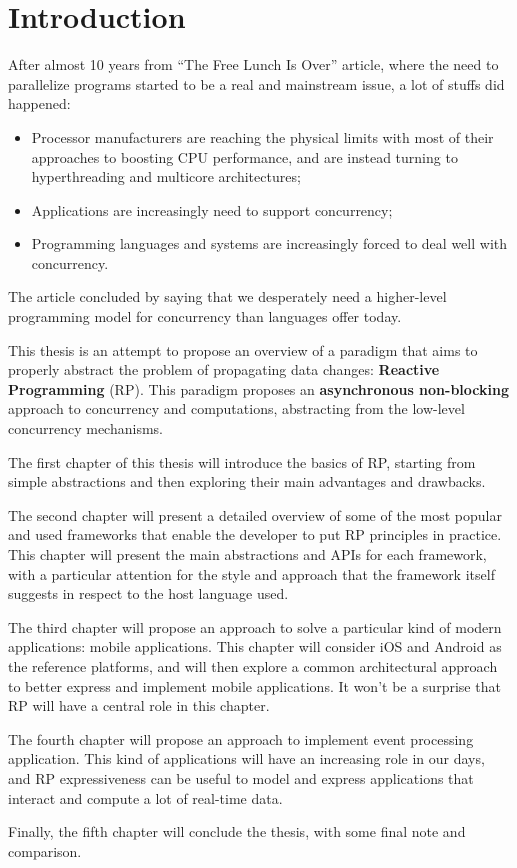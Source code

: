 \chapter{Introduction}
\label{ch:intro}

After almost 10 years from ``The Free Lunch Is Over'' article, where the
need to parallelize programs started to be a real and mainstream issue,
a lot of stuffs did happened:

\begin{itemize}
\item
  Processor manufacturers are reaching the physical limits with most of
  their approaches to boosting CPU performance, and are instead turning
  to hyperthreading and multicore architectures;
\item
  Applications are increasingly need to support concurrency;
\item
  Programming languages and systems are increasingly forced to deal well
  with concurrency.
\end{itemize}

The article concluded by saying that we desperately need a higher-level
programming model for concurrency than languages offer today.

This thesis is an attempt to propose an overview of a paradigm that aims
to properly abstract the problem of propagating data changes:
\textbf{Reactive Programming} (RP). This paradigm proposes an
\textbf{asynchronous non-blocking} approach to concurrency and
computations, abstracting from the low-level concurrency mechanisms.


The first chapter of this thesis will introduce the basics of RP, starting from simple abstractions and then exploring their main advantages and drawbacks.

The second chapter will present a detailed overview of some of the most popular and used frameworks that enable the developer to put RP principles in practice. This chapter will present the main abstractions and APIs for each framework, with a particular attention for the style and approach that the framework itself suggests in respect to the host language used.

The third chapter will propose an approach to solve a particular kind of modern applications: mobile applications. This chapter will consider iOS and Android as the reference platforms, and will then explore a common architectural approach to better express and implement mobile applications. It won't be a surprise that RP will have a central role in this chapter.

The fourth chapter will propose an approach to implement event processing application. This kind of applications will have an increasing role in our days, and RP expressiveness can be useful to model and express applications that interact and compute a lot of real-time data.

Finally, the fifth chapter will conclude the thesis, with some final note and comparison.



